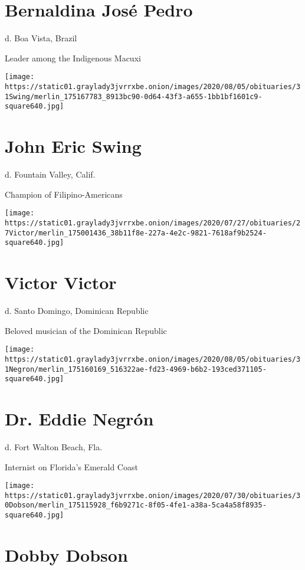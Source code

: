 \hypertarget{bernaldina-josuxe9-pedro}{%
\section{Bernaldina José Pedro}\label{bernaldina-josuxe9-pedro}}

d. Boa Vista, Brazil

Leader among the Indigenous Macuxi

\texttt{[image: https://static01.graylady3jvrrxbe.onion/images/2020/08/05/obituaries/31Swing/merlin\_175167783\_8913bc90-0d64-43f3-a655-1bb1bf1601c9-square640.jpg]}

\hypertarget{john-eric-swing}{%
\section{John Eric Swing}\label{john-eric-swing}}

d. Fountain Valley, Calif.

Champion of Filipino-Americans

\texttt{[image: https://static01.graylady3jvrrxbe.onion/images/2020/07/27/obituaries/27Victor/merlin\_175001436\_38b11f8e-227a-4e2c-9821-7618af9b2524-square640.jpg]}

\hypertarget{victor-victor}{%
\section{Victor Victor}\label{victor-victor}}

d. Santo Domingo, Dominican Republic

Beloved musician of the Dominican Republic

\texttt{[image: https://static01.graylady3jvrrxbe.onion/images/2020/08/05/obituaries/31Negron/merlin\_175160169\_516322ae-fd23-4969-b6b2-193ced371105-square640.jpg]}

\hypertarget{dr-eddie-negruxf3n}{%
\section{Dr. Eddie Negrón}\label{dr-eddie-negruxf3n}}

d. Fort Walton Beach, Fla.

Internist on Florida's Emerald Coast

\texttt{[image: https://static01.graylady3jvrrxbe.onion/images/2020/07/30/obituaries/30Dobson/merlin\_175115928\_f6b9271c-8f05-4fe1-a38a-5ca4a58f8935-square640.jpg]}

\hypertarget{dobby-dobson}{%
\section{Dobby Dobson}\label{dobby-dobson}}

